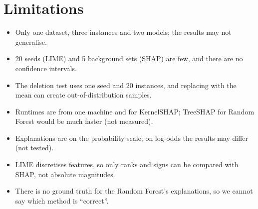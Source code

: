 \documentclass[11pt,a4paper]{article}
\begin{document}
\section{Limitations}\label{app:limits}
\begin{itemize}
  \item Only one dataset, three instances and two models; the results may not generalise.
  \item 20 seeds (LIME) and 5 background sets (SHAP) are few, and there are no confidence intervals.
  \item The deletion test uses one seed and 20 instances, and replacing with the mean can create out-of-distribution samples.
  \item Runtimes are from one machine and for KernelSHAP; TreeSHAP for Random Forest would be much faster (not measured).
  \item Explanations are on the probability scale; on log-odds the results may differ (not tested).
  \item LIME discretises features, so only ranks and signs can be compared with SHAP, not absolute magnitudes.
  \item There is no ground truth for the Random Forest's explanations, so we cannot say which method is ``correct''.
\end{itemize}
\end{document}
